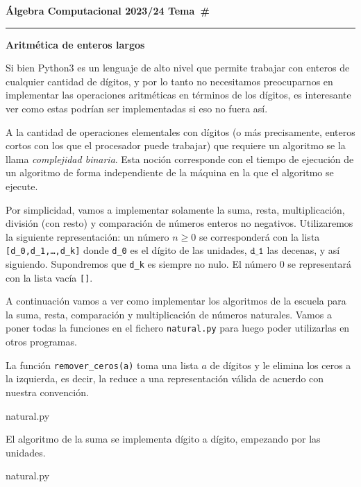 \documentclass[a4paper, 11pt]{article}
\newcounter{numerodetema}
\newcommand\tema[1]{{\eject\stepcounter{numerodetema}\bf Álgebra Computacional
2023/24 \hfill Tema~\#\arabic{numerodetema}}\par\smallskip\hrule\bigskip\par
\begin{center}{\Large\bf #1}\end{center}}
\theoremstyle{plain}
\theoremstyle{definition}
\begin{document}
\setcounter{numerodetema}{2}
\tema{Aritmética de enteros largos}

Si bien Python3 es un lenguaje de alto nivel que permite trabajar con
enteros de cualquier cantidad de dígitos, y por lo tanto no necesitamos
preocuparnos en implementar las operaciones aritméticas en términos de
los dígitos, es interesante ver como estas podrían ser implementadas si
eso no fuera así.

\bigskip

A la cantidad de operaciones elementales con dígitos (o más precisamente,
enteros cortos con los que el procesador puede trabajar) que requiere un
algoritmo se la llama \emph{complejidad binaria}. Esta noción corresponde
con el tiempo de ejecución de un algoritmo de forma independiente de la
máquina en la que el algoritmo se ejecute.

\bigskip

Por simplicidad, vamos a implementar solamente la suma, resta, multiplicación,
división (con resto) y comparación de números enteros no negativos. Utilizaremos
la siguiente representación: un número $n\geq 0$ se corresponderá con la lista
\texttt{[d\_0,d\_1,\ldots,d\_k]} donde \texttt{d\_0} es el dígito de las
unidades, $\texttt{d\_1}$ las decenas, y así siguiendo. Supondremos que 
\texttt{d\_k} es siempre no nulo. El número $0$ se representará con la lista
vacía \texttt{[]}.

\bigskip

A continuación vamos a ver como implementar los algoritmos de la escuela para
la suma, resta, comparación y multiplicación de números naturales. Vamos a
poner todas la funciones en el fichero \texttt{natural.py} para luego
poder utilizarlas en otros programas.

\bigskip

La función \texttt{remover\_ceros(a)} toma una lista $a$ de
dígitos y le elimina los ceros a la izquierda, es decir, la reduce a una
representación válida de acuerdo con nuestra convención.

\bigskip


{natural.py}

\bigskip

El algoritmo de la suma se implementa dígito a dígito, empezando por
las unidades.

\bigskip


{natural.py}
\end{document}
